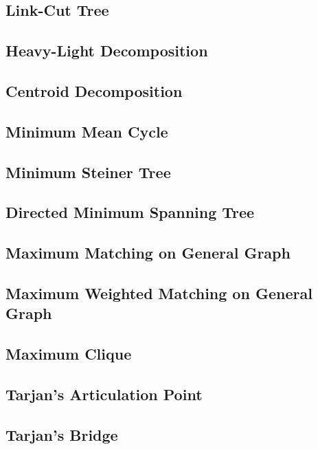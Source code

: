 \documentclass[a4paper,10pt,twocolumn,oneside]{article}
\begin{document}
\subsection{Link-Cut Tree}

\subsection{Heavy-Light Decomposition}

\subsection{Centroid Decomposition}

\subsection{Minimum Mean Cycle}

\subsection{Minimum Steiner Tree}

\subsection{Directed Minimum Spanning Tree}

\subsection{Maximum Matching on General Graph}

\subsection{Maximum Weighted Matching on General Graph}

\subsection{Maximum Clique}

\subsection{Tarjan's Articulation Point}

\subsection{Tarjan's Bridge}

\end{document}
